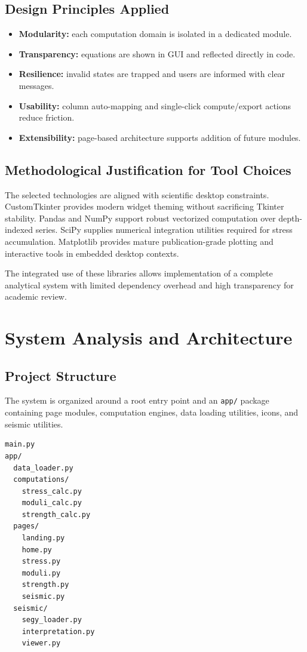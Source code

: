 \documentclass[12pt,a4paper]{report}
\begin{document}
\section{Design Principles Applied}
\begin{itemize}
    \item \textbf{Modularity:} each computation domain is isolated in a dedicated module.
    \item \textbf{Transparency:} equations are shown in GUI and reflected directly in code.
    \item \textbf{Resilience:} invalid states are trapped and users are informed with clear messages.
    \item \textbf{Usability:} column auto-mapping and single-click compute/export actions reduce friction.
    \item \textbf{Extensibility:} page-based architecture supports addition of future modules.
\end{itemize}

\section{Methodological Justification for Tool Choices}
The selected technologies are aligned with scientific desktop constraints. CustomTkinter provides modern widget theming without sacrificing Tkinter stability. Pandas and NumPy support robust vectorized computation over depth-indexed series. SciPy supplies numerical integration utilities required for stress accumulation. Matplotlib provides mature publication-grade plotting and interactive tools in embedded desktop contexts.

The integrated use of these libraries allows implementation of a complete analytical system with limited dependency overhead and high transparency for academic review.

\chapter{System Analysis and Architecture}
\section{Project Structure}
The system is organized around a root entry point and an \texttt{app/} package containing page modules, computation engines, data loading utilities, icons, and seismic utilities.

\begin{lstlisting}[style=pythonstyle,caption={Simplified structure of implemented solution}]
main.py
app/
  data_loader.py
  computations/
    stress_calc.py
    moduli_calc.py
    strength_calc.py
  pages/
    landing.py
    home.py
    stress.py
    moduli.py
    strength.py
    seismic.py
  seismic/
    segy_loader.py
    interpretation.py
    viewer.py
\end{lstlisting}
\end{document}

